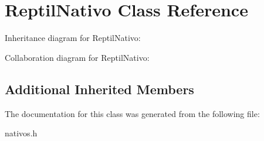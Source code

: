 \hypertarget{classReptilNativo}{}\section{Reptil\+Nativo Class Reference}
\label{classReptilNativo}


Inheritance diagram for Reptil\+Nativo\+:


Collaboration diagram for Reptil\+Nativo\+:
\subsection*{Additional Inherited Members}


The documentation for this class was generated from the following file\+:\begin{DoxyCompactItemize}
\item 
nativos.\+h\end{DoxyCompactItemize}
